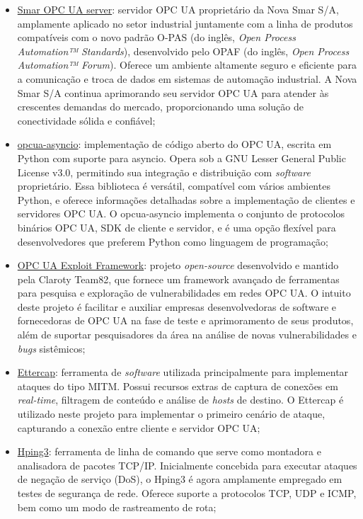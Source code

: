         \begin{itemize}
            \item \underline{Smar OPC UA server}: servidor OPC UA proprietário da Nova Smar S/A, amplamente aplicado no setor industrial juntamente com a linha de produtos compatíveis com o novo padrão O-PAS (do inglês, \textit{Open Process Automation™ Standards}), desenvolvido pelo OPAF (do inglês, \textit{Open Process Automation™ Forum}). Oferece um ambiente altamente seguro e eficiente para a comunicação e troca de dados em sistemas de automação industrial. A Nova Smar S/A continua aprimorando seu servidor OPC UA para atender às crescentes demandas do mercado, proporcionando uma solução de conectividade sólida e confiável;
            \item \underline{opcua-asyncio}: implementação de código aberto do OPC UA, escrita em Python com suporte para asyncio. Opera sob a GNU Lesser General Public License v3.0, permitindo sua integração e distribuição com \textit{software} proprietário. Essa biblioteca é versátil, compatível com vários ambientes Python, e oferece informações detalhadas sobre a implementação de clientes e servidores OPC UA. O opcua-asyncio implementa o conjunto de protocolos binários OPC UA, SDK de cliente e servidor, e é uma opção flexível para desenvolvedores que preferem Python como linguagem de programação;
            \item \underline{OPC UA Exploit Framework}: projeto \textit{open-source} desenvolvido e mantido pela Claroty Team82, que fornece um framework avançado de ferramentas para pesquisa e exploração de vulnerabilidades em redes OPC UA. O intuito deste projeto é facilitar e auxiliar empresas desenvolvedoras de software e fornecedoras de OPC UA na fase de teste e aprimoramento de seus produtos, além de suportar pesquisadores da área na análise de novas vulnerabilidades e \textit{bugs} sistêmicos;
            \item \underline{Ettercap}: ferramenta de \textit{software} utilizada principalmente para implementar ataques do tipo MITM. Possui recursos extras de captura de conexões em \textit{real-time}, filtragem de conteúdo e análise de \textit{hosts} de destino. O Ettercap é utilizado neste projeto para implementar o primeiro cenário de ataque, capturando a conexão entre cliente e servidor OPC UA;
            \item \underline{Hping3}: ferramenta de linha de comando que serve como montadora e analisadora de pacotes TCP/IP. Inicialmente concebida para executar ataques de negação de serviço (DoS), o Hping3 é agora amplamente empregado em testes de segurança de rede. Oferece suporte a protocolos TCP, UDP e ICMP, bem como um modo de rastreamento de rota;

\end{itemize}
